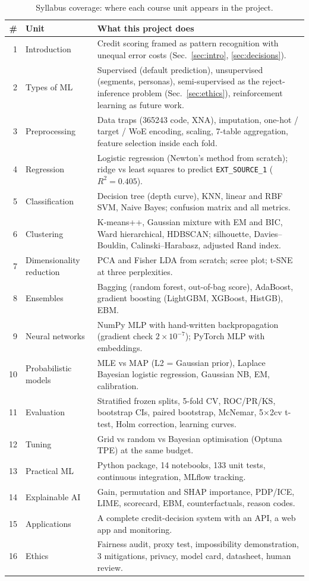 \documentclass[conference,10pt]{IEEEtran}
\begin{document}
\begin{table}[t]
\centering\small
\caption{Syllabus coverage: where each course unit appears in the project.}
\label{tab:syllabus}
\begin{tabular}{@{}rlp{12.6cm}@{}}
\toprule
\# & Unit & What this project does \\
\midrule
1 & Introduction & Credit scoring framed as pattern recognition with unequal error costs (Sec.~\ref{sec:intro}, \ref{sec:decisions}). \\
2 & Types of ML & Supervised (default prediction), unsupervised (segments, personas), semi-supervised as the reject-inference problem (Sec.~\ref{sec:ethics}), reinforcement learning as future work. \\
3 & Preprocessing & Data traps (365243 code, XNA), imputation, one-hot / target / WoE encoding, scaling, 7-table aggregation, feature selection inside each fold. \\
4 & Regression & Logistic regression (Newton's method from scratch); ridge vs least squares to predict \texttt{EXT\_SOURCE\_1} ($R^2=0.405$). \\
5 & Classification & Decision tree (depth curve), KNN, linear and RBF SVM, Naive Bayes; confusion matrix and all metrics. \\
6 & Clustering & K-means++, Gaussian mixture with EM and BIC, Ward hierarchical, HDBSCAN; silhouette, Davies--Bouldin, Calinski--Harabasz, adjusted Rand index. \\
7 & Dimensionality reduction & PCA and Fisher LDA from scratch; scree plot; t-SNE at three perplexities. \\
8 & Ensembles & Bagging (random forest, out-of-bag score), AdaBoost, gradient boosting (LightGBM, XGBoost, HistGB), EBM. \\
9 & Neural networks & NumPy MLP with hand-written backpropagation (gradient check $2\times10^{-7}$); PyTorch MLP with embeddings. \\
10 & Probabilistic models & MLE vs MAP (L2 = Gaussian prior), Laplace Bayesian logistic regression, Gaussian NB, EM, calibration. \\
11 & Evaluation & Stratified frozen splits, 5-fold CV, ROC/PR/KS, bootstrap CIs, paired bootstrap, McNemar, 5$\times$2cv t-test, Holm correction, learning curves. \\
12 & Tuning & Grid vs random vs Bayesian optimisation (Optuna TPE) at the same budget. \\
13 & Practical ML & Python package, 14 notebooks, 133 unit tests, continuous integration, MLflow tracking. \\
14 & Explainable AI & Gain, permutation and SHAP importance, PDP/ICE, LIME, scorecard, EBM, counterfactuals, reason codes. \\
15 & Applications & A complete credit-decision system with an API, a web app and monitoring. \\
16 & Ethics & Fairness audit, proxy test, impossibility demonstration, 3 mitigations, privacy, model card, datasheet, human review. \\
\bottomrule
\end{tabular}
\end{table}
\end{document}
